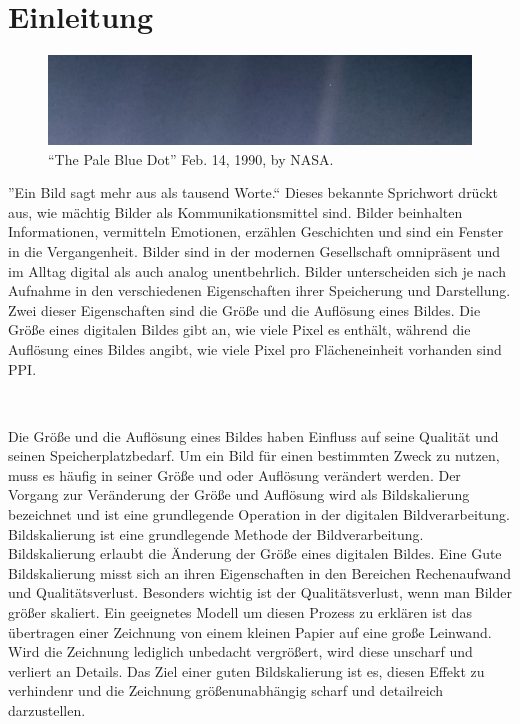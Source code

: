 



\chapter{Einleitung}
    
    \begin{center}
        \begin{figure}[h]
            \includegraphics[width=\textwidth]{img/PIA23645_PaleBlueDotRevisited_1600.jpg}
            \caption{``The Pale Blue Dot'' Feb. 14, 1990, by NASA\footnotemark.}
            \vspace{-6mm}
            \label{fig:my_label}
        \end{figure}
    \end{center}
    
    ''Ein Bild sagt mehr aus als tausend Worte.`` Dieses bekannte Sprichwort drückt aus, wie mächtig Bilder als Kommunikationsmittel sind. 
    Bilder beinhalten Informationen, vermitteln Emotionen, erzählen Geschichten und sind ein Fenster in die Vergangenheit. 
    Bilder sind in der modernen Gesellschaft omnipräsent und im Alltag digital als auch analog unentbehrlich.
    Bilder unterscheiden sich je nach Aufnahme in den verschiedenen Eigenschaften ihrer Speicherung und Darstellung. 
    Zwei dieser Eigenschaften sind die Größe und die Auflösung eines Bildes. 
    Die Größe eines digitalen Bildes gibt an, wie viele Pixel es enthält, während die Auflösung eines Bildes angibt, wie viele Pixel pro Flächeneinheit vorhanden sind \ac{PPI}.
    
    ~
    
    Die Größe und die Auflösung eines Bildes haben Einfluss auf seine Qualität und seinen Speicherplatzbedarf. 
    Um ein Bild für einen bestimmten Zweck zu nutzen, muss es häufig in seiner Größe und oder Auflösung verändert werden. 
    Der Vorgang zur Veränderung der Größe und Auflösung wird als Bildskalierung bezeichnet und ist eine grundlegende Operation in der digitalen Bildverarbeitung.
    Bildskalierung ist eine grundlegende Methode der Bildverarbeitung. Bildskalierung erlaubt die Änderung der Größe eines digitalen Bildes.
    Eine Gute Bildskalierung misst sich an ihren Eigenschaften in den Bereichen Rechenaufwand und Qualitätsverlust. 
    Besonders wichtig ist der Qualitätsverlust, wenn man Bilder größer skaliert. 
    Ein geeignetes Modell um diesen Prozess zu erklären ist das übertragen einer Zeichnung von einem kleinen Papier auf eine große Leinwand. 
    Wird die Zeichnung lediglich unbedacht vergrößert, wird diese unscharf und verliert an Details. 
    Das Ziel einer guten Bildskalierung ist es, diesen Effekt zu verhindenr und die Zeichnung größenunabhängig scharf und detailreich darzustellen.
    
